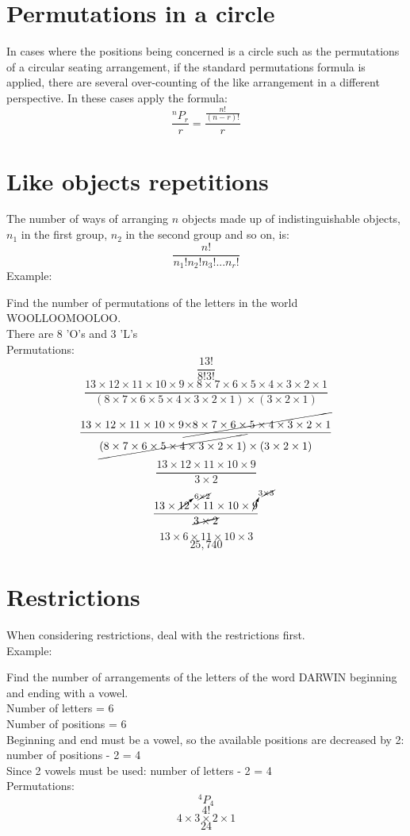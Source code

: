 \documentclass{book}
\begin{document}
\section{Permutations in a circle}
In cases where the positions being concerned is a circle such as the permutations of a circular seating arrangement, if the standard permutations formula is applied, there are several over-counting of the like arrangement in a different perspective.  In these cases apply the formula:
\[
	\frac{^nP_r}{r} = \frac{\frac{n!}{(n-r)!}}{r}
\]

\section{Like objects repetitions}
The number of ways of arranging $n$ objects made up of indistinguishable objects, $n_1$ in the first group, $n_2$ in the second group and so on, is:
\[
	\frac{n!}{n_1! n_2! n_3!... n_r!}
\]
Example:\\
\begin{center}
	Find the number of permutations of the letters in the world WOOLLOOMOOLOO.\\
	There are 8 'O's and 3 'L's\\
	Permutations:
	\[\frac{13!}{8!3!}\]
	\[\frac{13 \times 12 \times 11 \times 10 \times 9 \times 8 \times 7 \times 6 \times 5 \times 4 \times 3 \times 2 \times 1}{(8 \times 7 \times 6 \times 5 \times 4 \times 3 \times 2 \times 1) \times (3 \times 2 \times 1)}\]
	\[\frac{13 \times 12 \times 11 \times 10 \times 9 \cancel{\times 8 \times 7 \times 6 \times 5 \times 4 \times 3 \times 2 \times 1}}{\cancel{(8 \times 7 \times 6 \times 5 \times 4 \times 3 \times 2 \times 1)} \times (3 \times 2 \times 1)}\]
	\[\frac{13 \times 12 \times 11 \times 10 \times 9}{3 \times 2}\]
	\[\frac{13 \times \cancelto{6 \cancel{\times 2}}{12} \times 11 \times 10 \times \cancelto{3 \cancel{\times 3}}{9}}{\cancel{3 \times 2}}\]
	\[13 \times 6 \times 11 \times 10 \times 3\]
	\[25,740\]
\end{center}

\section{Restrictions}
When considering restrictions, deal with the restrictions first.\\
Example:\\
\begin{center}
	Find the number of arrangements of the letters of the word DARWIN beginning and ending with a vowel.\\
	Number of letters = 6\\
	Number of positions = 6\\
	Beginning and end must be a vowel, so the available positions are decreased by 2: number of positions - 2 = 4\\
	Since 2 vowels must be used:  number of letters - 2 = 4\\
	Permutations:
	\[^4P_4\]
	\[4!\]
	\[4 \times 3 \times 2 \times 1\]
	\[24\]
\end{center}
\end{document}
